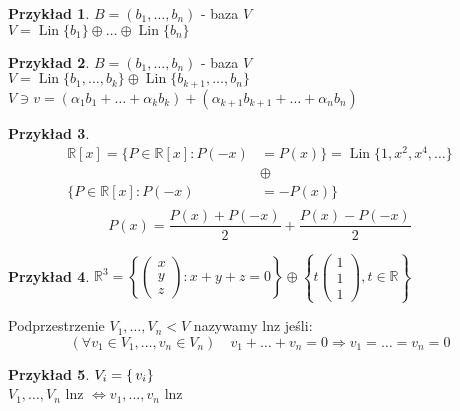 \documentclass[10pt]{article}
\theoremstyle{definition}
\theoremstyle{definition}
\theoremstyle{definition}
\theoremstyle{definition}
\theoremstyle{remark}
\theoremstyle{definition}
\theoremstyle{definition}
\theoremstyle{definition}
\theoremstyle{definition}
\newtheorem*{prz}{Przykład}
\theoremstyle{definition}
\begin{document}
\begin{prz} 
    $B = (b_1,\ldots,b_n)$ - baza $V$ \\ 
    $V = \operatorname{Lin}\{b_1\} \oplus \ldots \oplus \operatorname{Lin}\{b_n\}$
\end{prz}
\begin{prz} 
    $B = (b_1,\ldots,b_n)$ - baza $V$ \\ 
    $V = \operatorname{Lin}\{b_1,\ldots,b_k\} \oplus \operatorname{Lin}\{b_{k+1},\ldots,b_n\}$ \\ 
    $V \ni v = (\alpha_1 b_1 + \ldots + \alpha_k b_k) + (\alpha_{k+1} b_{k+1} + \ldots + \alpha_n b_n)$ 
\end{prz} 
\begin{prz} 
    \begin{align*}
        \mathbb{R}[x] = \{ P \in \mathbb{R}[x] : P(-x) &= P(x) \} = \operatorname{Lin}\{1,x^2,x^4,\ldots\} \\ 
        &\oplus \\ 
        \{ P \in \mathbb{R}[x] : P(-x) &= -P(x) \}  \\ 
    \end{align*}
    \[P(x) = \frac{P(x)+P(-x)}{2} + \frac{P(x) - P(-x)}{2} \]
\end{prz}
\begin{prz} 
    $\mathbb{R}^3 = \left\{ \begin{pmatrix} x \\ y \\ z \end{pmatrix}: x + y + z = 0 \right\} \oplus 
    \left\{ t \begin{pmatrix} 1 \\ 1 \\ 1 \end{pmatrix}, t \in \mathbb{R} \right\} $
\end{prz}
\begin{df} 
    Podprzestrzenie $V_1,\ldots,V_n < V$ nazywamy lnz jeśli: 
    \[ (\forall v_1 \in V_1,\ldots,v_n \in V_n) \quad v_1 + \ldots +v_n = 0 \Rightarrow v_1 = \ldots = v_n = 0 \]
\end{df} 
\begin{prz} 
    $V_i = \operatorname\{v_i\}$ \\ 
    $V_1,\ldots,V_n$ lnz $\Leftrightarrow v_1,\ldots,v_n$ lnz 
\end{prz}
\end{document}
